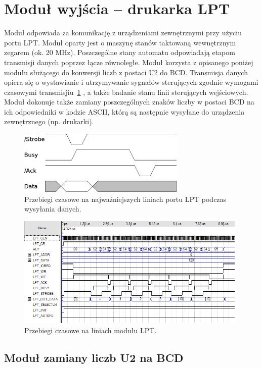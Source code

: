 \documentclass[a4paper,12pt]{report}
\begin{document}
\section{Moduł wyjścia -- drukarka LPT}
Moduł odpowiada za komunikację z urządzeniami zewnętrznymi przy użyciu portu LPT. Moduł oparty jest o maszynę stanów taktowaną wewnętrznym zegarem (ok. 20 MHz). Poszczególne stany automatu odpowiadają etapom transmisji danych poprzez łącze równoległe. Moduł korzysta z opisanego poniżej modułu służącego do konwersji liczb z postaci U2 do BCD. Transmisja danych opiera się o wystawianie i utrzymywanie sygnałów sterujących zgodnie wymogami czasowymi transmisjiu~\ref{fig:lpt} , a także badanie stanu linii sterujących wejściowych. Moduł dokonuje także zamiany poszczególnych znaków liczby w postaci BCD na ich odpowiedniki w kodzie ASCII, którą są następnie wysyłane do urządzenia zewnętrznego (np. drukarki).

\begin{figure}[h]
\centering
\includegraphics[width=8cm]{./pict/LPT.png}
\caption{Przebiegi czasowe na najważniejszych liniach portu LPT podczas wysyłania danych.}
\label{fig:lpt}
\end{figure}

\begin{figure}[h]
\centering
\includegraphics[width=11cm]{./pict/LPT_sim.png}
\caption{Przebiegi czasowe na liniach modułu LPT.}
\label{fig:lpt_sim}
\end{figure}

\subsection{Moduł zamiany liczb U2 na BCD}
\end{document}
